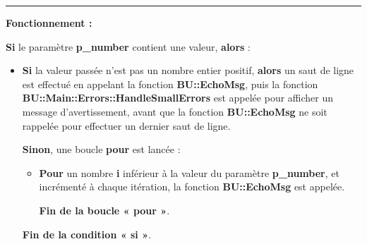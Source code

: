 \documentclass[a4paper,10pt]{article}
\begin{document}

\par\noindent\rule{\textwidth}{0.4pt}

\begin{justify}
    \textbf{Fonctionnement :}

    \textbf{\color{cond}Si} le paramètre \textbf{\color{vars}p\_number} contient une valeur, \textbf{\color{cond}alors} :

    \begin{itemize}
        \item
        {
            \begin{justify}
                \textbf{\color{cond}Si} la valeur passée n'est pas un nombre entier positif, \textbf{\color{cond}alors} un saut de ligne est effectué en appelant la fonction \textbf{\color{func}BU::EchoMsg}, puis la fonction \textbf{\color{func}BU::Main::Errors::HandleSmallErrors} est appelée pour afficher un message d'avertissement, avant que la fonction \textbf{\color{func}BU::EchoMsg} ne soit rappelée pour effectuer un dernier saut de ligne.
            \end{justify}

            \setlength{\parskip}{1em}

            \begin{justify}
                \textbf{\color{cond}Sinon}, une boucle \textbf{\color{loop}pour} est lancée :

                \begin{itemize}
                    \item
                    {
                        \begin{justify}
                            \textbf{\color{loop}Pour} un nombre \textbf{\color{vars}i} inférieur à la valeur du paramètre \textbf{\color{vars}p\_number}, et incrémenté à chaque itération, la fonction \textbf{\color{func}BU::EchoMsg} est appelée.
                        \end{justify}

                        \setlength{\parskip}{1em}

                        \begin{justify}
                            \textbf{\color{loop}Fin de la boucle « pour »}.
                        \end{justify}
                    }
                \end{itemize}
            \end{justify}

            \begin{justify}
                \textbf{\color{cond}Fin de la condition « si »}.
            \end{justify}
        }
    \end{itemize}
\end{justify}
\end{document}
